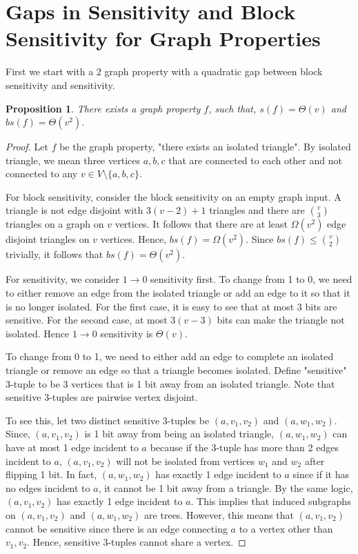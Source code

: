 \documentclass[psamsfonts]{amsart}
\newtheorem{prop}[theorem]{Proposition}
\theoremstyle{definition}
\theoremstyle{remark}
\numberwithin{equation}{section}
\begin{document}
	\section{Gaps in Sensitivity and Block Sensitivity for Graph Properties}
	First we start with a $2$ graph property with a quadratic gap between block sensitivity and sensitivity.

\begin{prop}
There exists a graph property $f$, such that, $s(f) = \Theta(v)$ and $bs(f) = \Theta(v^2)$.
\end{prop} 

\begin{proof}
Let $f$ be the graph property, "there exists an isolated triangle". By isolated triangle, we mean three vertices $a,b,c$ that are connected to each other and not connected to any $v \in V\setminus\{a,b,c\}$.

For block sensitivity, consider the block sensitivity on an empty graph input. A triangle is not edge disjoint with $3(v-2)+1$ triangles and there are ${v \choose 3}$ triangles on a graph on $v$ vertices. It follows that there are at least $\Omega(v^2)$ edge disjoint triangles on $v$ vertices. Hence, $bs(f) = \Omega(v^2)$. Since $bs(f) \leq {v \choose 2}$ trivially, it follows that $bs(f) = \Theta(v^2)$.

For sensitivity, we consider $1 \rightarrow 0$ sensitivity first. To change from 1 to 0, we need to either remove an edge from the isolated triangle or add an edge to it so that it is no longer isolated. For the first case, it is easy to see that at most 3 bits are sensitive. For the second case, at most $3(v-3)$ bits can make the triangle not isolated. Hence $1 \rightarrow 0$ sensitivity is $\Theta(v)$.

To change from 0 to 1, we need to either add an edge to complete an isolated triangle or remove an edge so that a triangle becomes isolated. Define "sensitive" 3-tuple to be 3 vertices that is 1 bit away from an isolated triangle. Note that sensitive 3-tuples are pairwise vertex disjoint. 

To see this, let two distinct sensitive 3-tuples be $(a,v_1,v_2)$ and $(a,w_1,w_2)$. Since, $(a,v_1,v_2)$ is 1 bit away from being an isolated triangle, $(a,w_1,w_2)$ can have at most 1 edge incident to $a$ because if the 3-tuple has more than 2 edges incident to $a$, $(a,v_1,v_2)$ will not be isolated from vertices $w_1$ and $w_2$ after flipping 1 bit. In fact, $(a,w_1,w_2)$ has exactly 1 edge incident to $a$ since if it has no edges incident to $a$, it cannot be 1 bit away from a triangle. By the same logic, $(a,v_1,v_2)$ has exactly 1 edge incident to $a$. This implies that induced subgraphs on $(a,v_1,v_2)$ and $(a,w_1,w_2)$ are trees. However, this means that $(a,v_1,v_2)$ cannot be sensitive since there is an edge connecting $a$ to a vertex other than $v_1,v_2$. Hence, sensitive 3-tuples cannot share a vertex. 


\end{proof}
\end{document}

